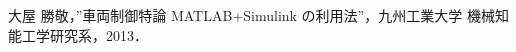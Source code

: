 \documentclass[a4paper,12pt]{jarticle}
\begin{document}




\begin{thebibliography}{99}
 大屋 勝敬，”車両制御特論 MATLAB+Simulink の利用法”，九州工業大学 機械知能工学研究系，2013．
\end{thebibliography}
\end{document}
